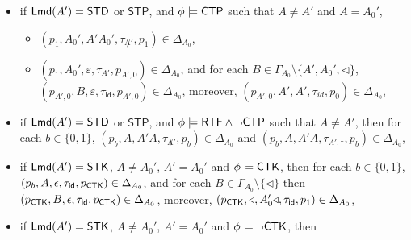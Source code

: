 \documentclass[preprint,12pt]{elsarticle}
\newcommand\lmd{{\sf Lmd}}
\newcommand\ctpflag{{\sf CTP}}
\newcommand\ctkflag{{\sf CTK}}
\newcommand\rtfflag{{\sf RTF}}
\newcommand{\STK}{\mathsf{STK}}
\newcommand{\STD}{\mathsf{STD}}
\newcommand{\STP}{\mathsf{STP}}
\newcommand{\id}{\mathsf{id}}
\begin{document}
{\begin{itemize}
\begin{itemize}
\begin{itemize}
                    \begin{itemize}
                        \item for each $b\in\{0,1\}$, we have $(p_b, A, A'A, \tau_{\not A'}, p_b) \in \Delta_{A_0}$, 
                        \item for each $b\in\{0,1\}$, we have $(p_b, A, \varepsilon, \tau_{A'}, p_{A',b}) \in \Delta_{A_0}$, and for each $B \in \Gamma_{A_0}\setminus\{A',A_0',\triangleleft\}$, $(p_{A',b}, B, \varepsilon, \tau_{\id}, p_{A',b}) \in \Delta_{A_0}$, moreover, $(p_{A',1},A_0',\varepsilon,\tau_{\id},p_{A',0})\in\Delta_{A_0}$, $(p_{A',b}, A', A', \tau_{id}, p_b)  \in \Delta_{A_0}$, 
                    \end{itemize}
                    \item if $\lmd(A') = \STD$ or $\STP$, and $\phi\models \ctpflag$ such that $A\neq A'$ and $A = A_0'$,
                    \begin{itemize}
                        \item $(p_1, A_0', A'A_0', \tau_{\not A'}, p_1) \in \Delta_{A_0}$, 
                        \item $(p_1, A_0', \varepsilon, \tau_{A'}, p_{A',0}) \in \Delta_{A_0}$, and for each $B \in \Gamma_{A_0}\setminus\{A',A_0',\triangleleft\}$, $(p_{A',0}, B, \varepsilon, \tau_{\id}, p_{A',0}) \in \Delta_{A_0}$, moreover, $(p_{A',0}, A', A', \tau_{id}, p_0)  \in \Delta_{A_0}$, 
                    \end{itemize}
                    \item if $\lmd(A') = \STD$ or $\STP$, and $\phi\models\rtfflag\wedge\neg\ctpflag$ such that $A\neq A'$,
                    then for each $b\in\{0,1\}$, $(p_b, A, A'A, \tau_{\not A'}, p_b) \in \Delta_{A_0}$ 
                    and $(p_b, A, A'A, \tau_{A', \dag}, p_b) \in \Delta_{A_0}$,
                    \item if $\lmd(A') = \STK$, $A\neq A_0'$, $A' = A_0'$ and $\phi\models\ctkflag$, then
                    for each $b\in\{0,1\}$, $(p_b, A, \epsilon, \tau_{\id}, p_{\ctkflag})\in\Delta_{A_0}$, 
                    and for each $B\in\Gamma_{A_0}\setminus\{\triangleleft\}$ then $(p_{\ctkflag},B,\epsilon,\tau_{\id}, p_{\ctkflag})\in\Delta_{A_0}$, moreover, $(p_{\ctkflag},\triangleleft,A_0'\triangleleft,\tau_{\id},p_1)\in\Delta_{A_0}$,
                    \item if $\lmd(A') = \STK$, $A\neq A_0'$, $A' = A_0'$ and $\phi\models\neg\ctkflag$, then

\end{itemize}
\end{itemize}
\end{itemize}}
\end{document}
